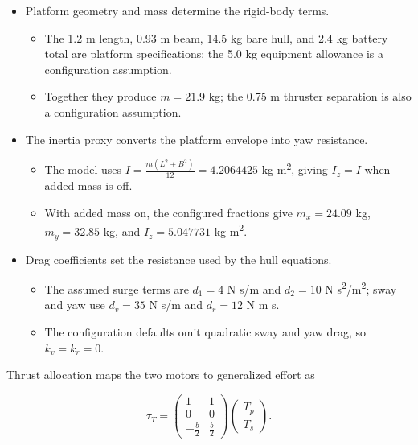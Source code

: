 \documentclass[10pt,letterpaper]{article}
\begin{document}
\begin{itemize}
\item
  Platform geometry and mass determine the rigid-body terms.

  \begin{itemize}
  \item
    The 1.2 m length, 0.93 m beam, 14.5 kg bare hull, and 2.4 kg battery total are platform specifications; the 5.0 kg equipment allowance is a configuration assumption.
  \item
    Together they produce \(m = 21.9\) kg; the 0.75 m thruster separation is also a configuration assumption.
  \end{itemize}
\item
  The inertia proxy converts the platform envelope into yaw resistance.

  \begin{itemize}
  \item
    The model uses \(I = \frac{m\left( L^{2} + B^{2} \right)}{12} = 4.2064425\) kg m\textsuperscript{2}, giving \(I_{z} = I\) when added mass is off.
  \item
    With added mass on, the configured fractions give \(m_{x} = 24.09\) kg, \(m_{y} = 32.85\) kg, and \(I_{z} = 5.047731\) kg m\textsuperscript{2}.
  \end{itemize}
\item
  Drag coefficients set the resistance used by the hull equations.

  \begin{itemize}
  \item
    The assumed surge terms are \(d_{1} = 4\) N s/m and \(d_{2} = 10\) N s\textsuperscript{2}/m\textsuperscript{2}; sway and yaw use \(d_{v} = 35\) N s/m and \(d_{r} = 12\) N m s.
  \item
    The configuration defaults omit quadratic sway and yaw drag, so \(k_{v} = k_{r} = 0\).
  \end{itemize}
\end{itemize}

Thrust allocation maps the two motors to generalized effort as

\begin{equation}
\tau_{T} = \begin{pmatrix}
1 & 1 \\
0 & 0 \\
 - \frac{b}{2} & \frac{b}{2}
\end{pmatrix}\begin{pmatrix}
T_{p} \\
T_{s}
\end{pmatrix}.
\end{equation}
\end{document}
